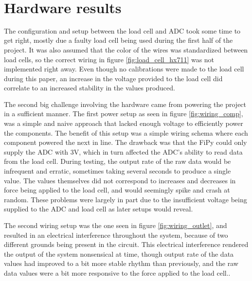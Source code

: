 \iffalse
\begin{itemize}
	\item Don’t make the reader do all the work
	\item Have a hypothesis, test them, state result clearly
	\item Two lists are not a comparison
	\item Be the first to criticize your own work
\end{itemize}
\fi
\
\section{Hardware results}
The configuration and setup between the load cell and ADC took some time to get right, mostly due a faulty load cell being used during the first half of the project. It was also assumed that the color of the wires was standardized between load cells, so the correct wiring in figure \ref{fig:load_cell_hx711} was not implemented right away. Even though no calibrations were made to the load cell during this paper, an increase in the voltage provided to the load cell did correlate to an increased stability in the values produced. 

The second big challenge involving the hardware came from powering the project in a sufficient manner. The first power setup as seen in figure \ref{fig:wiring_comp}, was a simple and naive approach that lacked enough voltage to efficiently power the components. The benefit of this setup was a simple wiring schema where each component powered the next in line. The drawback was that the FiPy could only supply the ADC with 3V, which in turn affected the ADC's ability to read data from the load cell. During testing, the output rate of the raw data would be infrequent and erratic, sometimes taking several seconds to produce a single value. The values themselves did not correspond to increases and decreases in force being applied to the load cell, and would seemingly spike and crash at random. These problems were largely in part due to the insufficient voltage being supplied to the ADC and load cell as later setups would reveal.

The second wiring setup was the one seen in figure \ref{fig:wiring_outlet}, and resulted in an electrical interference throughout the system, because of two different grounds being present in the circuit. This electrical interference rendered the output of the system nonsensical at time, though output rate of the data values had improved to a bit more stable rhythm than previously, and the raw data values were a bit more responsive to the force applied to the load cell..

